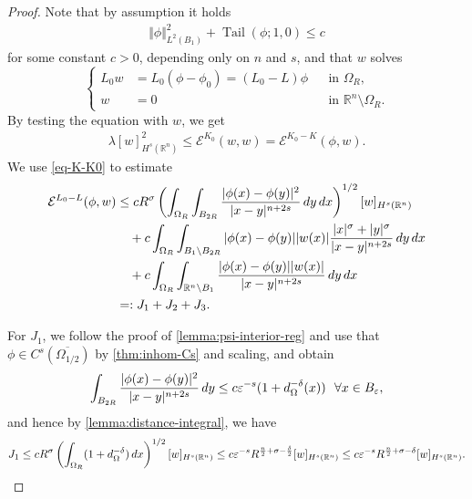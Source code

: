\documentclass[11pt,reqno]{amsart}
\theoremstyle{plain}
\theoremstyle{definition}
\numberwithin{equation}{section}
\newcommand{\R}{\mathbb{R}}
\newcommand{\cE}{\mathcal{E}}
\newcommand{\eps}{\varepsilon}
\newcommand{\1}{\mathbbm{1}}
\DeclareMathOperator{\tail}{Tail}
\renewcommand{\d}{\textnormal{\,d}}
\begin{document}
\begin{proof}
Note that by assumption it holds
\begin{align*}
    \Vert \phi \Vert_{L^2(B_1)}^2 + \tail(\phi;1,0)  \le c
\end{align*}
for some constant $c > 0$, depending only on $n$ and $s$, and that $w$ solves
\begin{equation}
\label{eq-w-Sect7}
\left\{
\begin{aligned}
L_{0}w & = L_0 (\phi - \phi_0) = (L_{0}-L)\phi &&\text{in }\Omega_R, \\
w & = 0 &&\text{in } \R^n \setminus \Omega_R.
\end{aligned}
\right.
\end{equation}
By testing the equation with $w$, we get
\begin{align*}
    \lambda [w]_{H^s(\R^n)}^2 \le \cE^{K_{0}}(w,w) = \cE^{K_{0}-K}(\phi, w).
\end{align*}
We use \eqref{eq-K-K0} to estimate
    \begin{align*}
        \cE^{L_{0}-L}(\phi,w) 
        &\le cR^{\sigma} \left(\int_{\Omega_{R}} \int_{B_{2R}}  \frac{|\phi(x) - \phi(y)|^2 }{|x-y|^{n+2s}} \d y \d x \right)^{1/2} [w]_{H^s(\R^n)} \\
        &\quad + c \int_{\Omega_R} \int_{B_1 \setminus B_{2R}} |\phi(x)-\phi(y)| |w(x)| \frac{|x|^\sigma + |y|^\sigma}{|x-y|^{n+2s}} \d y \d x \\
        &\quad + c \int_{\Omega_{R}} \int_{\R^n \setminus B_1} \frac{|\phi(x)-\phi(y)| |w(x)|}{|x-y|^{n+2s}} \d y \d x \\
        &=: J_1 + J_2 + J_3.
    \end{align*}

    For $J_1$, we follow the proof of \autoref{lemma:psi-interior-reg} and use that $\phi \in C^s(\overline{\Omega_{1/2}})$ by \autoref{thm:inhom-Cs} and scaling, and obtain
    \begin{align*}
        \int_{B_{2R}}  \frac{|\phi(x) - \phi(y)|^2 }{|x-y|^{n+2s}} \d y \le c \eps^{-s} (1 + d_{\Omega}^{-\delta}(x)) ~~ \forall x \in B_{\eps},
    \end{align*}
    and hence by \autoref{lemma:distance-integral}, we have
    \begin{align*}
        J_1 \le c R^{\sigma} \left(\int_{\Omega_{R}} (1 + d_{\Omega}^{-\delta}) \d x \right)^{1/2} [w]_{H^s(\R^n)} \le c \eps^{-s} R^{\frac{n}{2} + \sigma -\frac{\delta}{2}} [w]_{H^s(\R^n)} \leq c\eps^{-s} R^{\frac{n}{2} + \sigma -\delta} [w]_{H^s(\R^n)}.
    \end{align*}


\end{proof}
\end{document}
